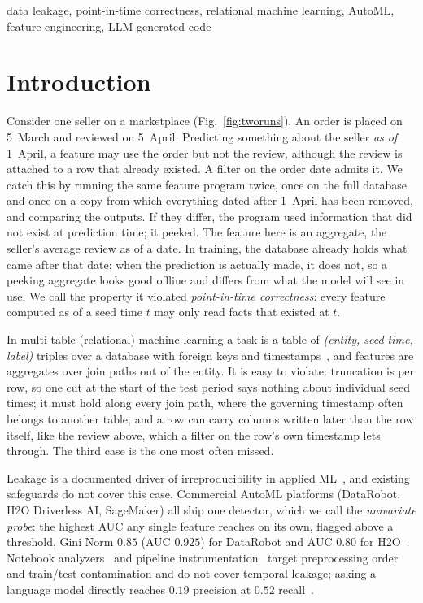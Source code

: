 \documentclass[conference]{IEEEtran}
\begin{document}
\begin{IEEEkeywords}
data leakage, point-in-time correctness, relational machine learning, AutoML,
feature engineering, LLM-generated code
\end{IEEEkeywords}

\section{Introduction}

Consider one seller on a marketplace (Fig.~\ref{fig:tworuns}). An order is placed on
5~March and reviewed on 5~April. Predicting something about the seller \emph{as of}
1~April, a feature may use the order but not the review, although the review is attached
to a row that already existed. A filter on the order date admits it. We catch this by
running the same feature program twice, once on the full database and once on a copy
from which everything dated after 1~April has been removed, and comparing the outputs.
If they differ, the program used information that did not exist at prediction time; it
peeked. The feature here is an aggregate, the seller's average review as of a date. In
training, the database already holds what came after that date; when the prediction is
actually made, it does not, so a peeking aggregate looks good offline and differs from
what the model will see in use. We call the property it violated \emph{point-in-time
correctness}: every feature computed as of a seed time $t$ may only read facts that
existed at $t$.

In multi-table (relational) machine learning a task is a table of \emph{(entity, seed
time, label)} triples over a database with foreign keys and timestamps~\cite{relbench},
and features are aggregates over join paths out of the entity. It is easy to violate: truncation is per row, so one cut at the start of the test
period says nothing about individual seed times; it must hold along every join path,
where the governing timestamp often belongs to another table; and a row can carry columns
written later than the row itself, like the review above, which a filter on the row's own
timestamp lets through. The third case is the one most often missed.

Leakage is a documented driver of irreproducibility in applied
ML~\cite{kaufman2011,kapoor2023}, and existing safeguards do not cover this case.
Commercial AutoML platforms (DataRobot, H2O
Driverless AI, SageMaker) all ship one detector, which we call the \emph{univariate probe}: the highest AUC any
single feature reaches on its own, flagged above a threshold, Gini Norm $0.85$ (AUC $0.925$)
for DataRobot and AUC $0.80$ for H2O~\cite{datarobot,h2o}. Notebook
analyzers~\cite{yang2022} and pipeline instrumentation~\cite{mlinspect} target
preprocessing order and train/test contamination and do not cover temporal leakage;
asking a language model directly reaches $0.19$ precision at $0.52$ recall~\cite{peerj2025}.
\end{document}

